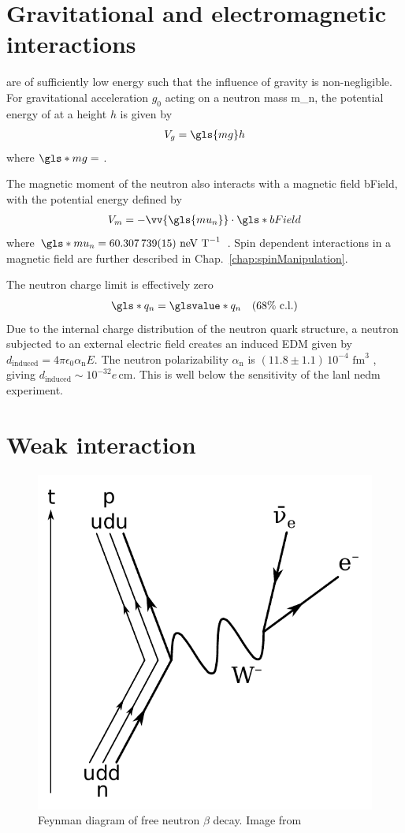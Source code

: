 
\section{Gravitational and electromagnetic interactions}\label{sec:ucn_grav_em}


\ucn are of sufficiently low energy such that the influence of gravity is non-negligible. For gravitational acceleration $g_0$ acting on a neutron mass \gls{m_n}, the potential energy of at a height $h$ is given by
%
\begin{gather}
    V_g = \gls{mg}h
\end{gather}
%
where $\gls*{mg}=$ \cite{codata_2018}.

The magnetic moment of the neutron also interacts with a magnetic field \gls*{bField}, with the potential energy defined by
%
\begin{gather}
    V_m = - \vv{\gls{mu_n}}\cdot \gls*{bField}
\end{gather}
%
where $\gls*{mu_n}=60.307\,739(15)\text{ neV T}^{-1}$ \cite{codata_2018}. Spin dependent interactions in a magnetic field are further described in Chap.~\ref{chap:spinManipulation}.

The neutron charge limit is effectively zero \cite{baumann_neutron_charge}
%
\begin{gather}
    \gls*{q_n}=\glsvalue*{q_n}\quad(68 \% \text{ c.l.})
\end{gather}
%
Due to the internal charge distribution of the neutron quark structure, a neutron subjected to an external electric field creates an induced EDM given by $d_\text{induced}=4\pi \epsilon_0 \alpha_\text{n} E$. The neutron polarizability $\alpha_\text{n}$ is $(11.8\pm 1.1)\,10^{-4}\text{ fm}^3$ \cite{pdg2022}, giving $d_\text{induced}\sim 10^{-32}e\,\text{cm}$. This is well below the sensitivity of the \acrshort*{lanl} \acrshort*{nedm} experiment.



\section{Weak interaction}\label{sec:weak_interaction}


\begin{figure}[htp]
    \centering
    \includegraphics[width=0.3 \textwidth]{figures/beta_negative_decay.pdf}
    \caption[Feynman diagram of free neutron $\beta$ decay]
    {Feynman diagram of free neutron $\beta$ decay. Image from \cite{beta_decay_fig}}
    \label{fig:beta_decay}
\end{figure}

